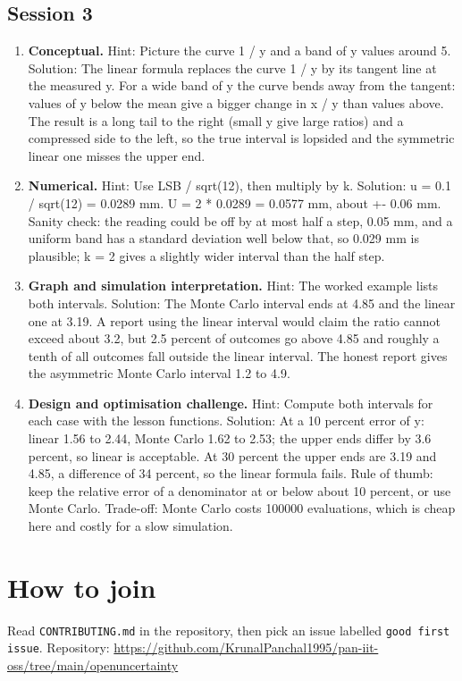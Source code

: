 \documentclass[11pt,a4paper]{article}
\begin{document}
\subsection*{Session 3}
\begin{enumerate}[nosep]
\item \textbf{Conceptual.} Hint: Picture the curve 1 / y and a band of y values around 5. Solution: The linear formula replaces the curve 1 / y by its tangent line at the measured y. For a wide band of y the curve bends away from the tangent: values of y below the mean give a bigger change in x / y than values above. The result is a long tail to the right (small y give large ratios) and a compressed side to the left, so the true interval is lopsided and the symmetric linear one misses the upper end.
\item \textbf{Numerical.} Hint: Use LSB / sqrt(12), then multiply by k. Solution: u = 0.1 / sqrt(12) = 0.0289 mm. U = 2 * 0.0289 = 0.0577 mm, about +- 0.06 mm. Sanity check: the reading could be off by at most half a step, 0.05 mm, and a uniform band has a standard deviation well below that, so 0.029 mm is plausible; k = 2 gives a slightly wider interval than the half step.
\item \textbf{Graph and simulation interpretation.} Hint: The worked example lists both intervals. Solution: The Monte Carlo interval ends at 4.85 and the linear one at 3.19. A report using the linear interval would claim the ratio cannot exceed about 3.2, but 2.5 percent of outcomes go above 4.85 and roughly a tenth of all outcomes fall outside the linear interval. The honest report gives the asymmetric Monte Carlo interval 1.2 to 4.9.
\item \textbf{Design and optimisation challenge.} Hint: Compute both intervals for each case with the lesson functions. Solution: At a 10 percent error of y: linear 1.56 to 2.44, Monte Carlo 1.62 to 2.53; the upper ends differ by 3.6 percent, so linear is acceptable. At 30 percent the upper ends are 3.19 and 4.85, a difference of 34 percent, so the linear formula fails. Rule of thumb: keep the relative error of a denominator at or below about 10 percent, or use Monte Carlo. Trade-off: Monte Carlo costs 100000 evaluations, which is cheap here and costly for a slow simulation.
\end{enumerate}

\section{How to join}
Read \texttt{CONTRIBUTING.md} in the repository, then pick an issue labelled \texttt{good first issue}. Repository: \url{https://github.com/KrunalPanchal1995/pan-iit-oss/tree/main/openuncertainty}
\end{document}
